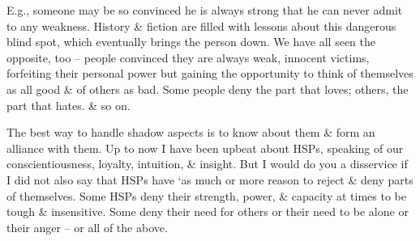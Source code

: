 \documentclass{article}
\numberwithin{equation}{section}
\begin{document}
E.g., someone may be so convinced he is always strong that he can never admit to any weakness. History \& fiction are filled with lessons about this dangerous blind spot, which eventually brings the person down. We have all seen the opposite, too -- people convinced they are always weak, innocent victims, forfeiting their personal power but gaining the opportunity to think of themselves as all good \& of others as bad. Some people deny the part that loves; others, the part that hates. \& so on.

The best way to handle shadow aspects is to know about them \& form an alliance with them. Up to now I have been upbeat about HSPs, speaking of our conscientiousness, loyalty, intuition, \& insight. But I would do you a disservice if I did not also say that HSPs have `as much or more reason to reject \& deny parts of themselves. Some HSPs deny their strength, power, \& capacity at times to be tough \& insensitive. Some deny their need for others or their need to be alone or their anger -- or all of the above.
\end{document}
